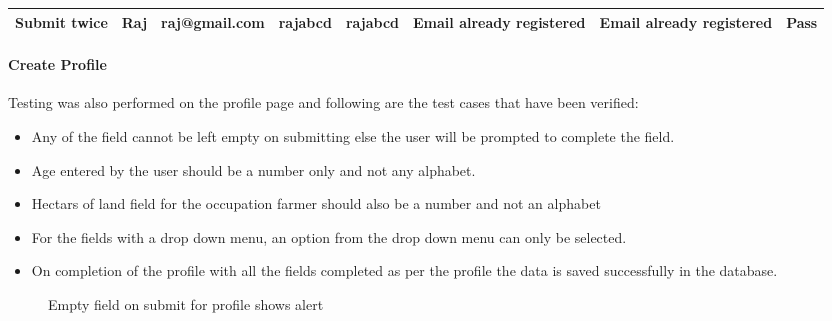 \documentclass[conference]{IEEEtran}
\begin{document}
\begin{table}[]
{\begin{tabular}{|l|l|l|l|l|l|l|l|}
Submit twice                                           & Raj                       & raj@gmail.com                 & rajabcd                       & rajabcd                                                                         & Email already registered                                                                                  & Email already registered                                                                                & Pass                                                                                                  \\ \hline
\end{tabular}%
}
\end{table}
\paragraph{Create Profile}
Testing was also performed on the profile page and following are the test cases that have been verified:
\begin{itemize}
\item Any of the field cannot be left empty on submitting else the user will be prompted to complete the field.
\item Age entered by the user should be a number only and not any alphabet.
\item Hectars of land field for the occupation farmer should also be a number and not an alphabet
\item For the fields with a drop down menu, an option from the drop down menu can only be selected.
\item On completion of the profile with all the fields completed as per the profile the data is saved successfully in the database.
\end{itemize}
\begin{figure}[h!]
\centering
{}
\caption{Empty field on submit for profile shows alert}
\end{figure}
\end{document}

